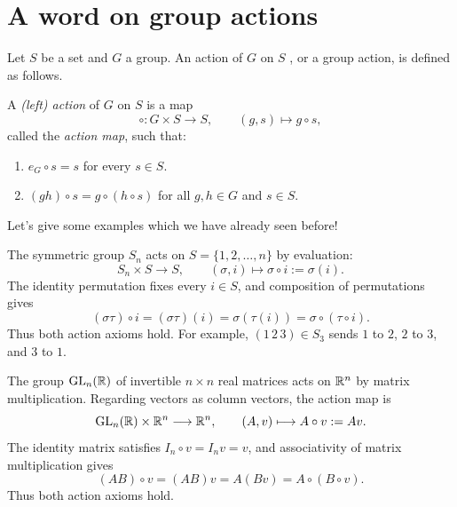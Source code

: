 \documentclass[reqno,11pt]{amsart}
\begin{document}
\raggedbottom
\makelecturetitle

\section{A word on group actions}

Let $S$ be a set and $G$ a group. An action of $G$ on $S$ , or a group action, is defined as follows.

\begin{define}
A \emph{(left) action} of $G$ on $S$ is a map
\[
  \circ:G\times S\longrightarrow S,\qquad (g,s)\longmapsto g\circ s,
\]
called the \emph{action map}, such that:
\begin{enumerate}[label=\textbf{(\arabic*)}]
  \item $e_G\circ s=s$ for every $s\in S$.
  \item $(gh)\circ s=g\circ(h\circ s)$ for all $g,h\in G$ and $s\in S$.
\end{enumerate}

\end{define}

Let's give some examples which we have already seen before!

\begin{example}
The symmetric group $S_n$ acts on $S=\{1,2,\ldots,n\}$ by evaluation:
\[
  S_n\times S\longrightarrow S,\qquad (\sigma,i)\longmapsto
  \sigma\circ i:=\sigma(i).
\]
The identity permutation fixes every $i\in S$, and composition of
permutations gives
\[
  (\sigma\tau)\circ i=(\sigma\tau)(i)
  =\sigma(\tau(i))=\sigma\circ(\tau\circ i).
\]
Thus both action axioms hold. For example, $(1\,2\,3)\in S_3$ sends
$1$ to $2$, $2$ to $3$, and $3$ to $1$.
\end{example}

\begin{example}
The group $\operatorname{GL}_n(\mathbb{R})$ of invertible $n\times n$ real matrices acts on
$\mathbb{R}^n$ by matrix multiplication. Regarding vectors as column vectors,
the action map is
\[
  \operatorname{GL}_n(\mathbb{R})\times\mathbb{R}^n\longrightarrow\mathbb{R}^n,\qquad
  (A,v)\longmapsto A\circ v:=Av.
\]
The identity matrix satisfies $I_n\circ v=I_nv=v$, and associativity
of matrix multiplication gives
\[
  (AB)\circ v=(AB)v=A(Bv)=A\circ(B\circ v).
\]
Thus both action axioms hold.
\end{example}
\end{document}
